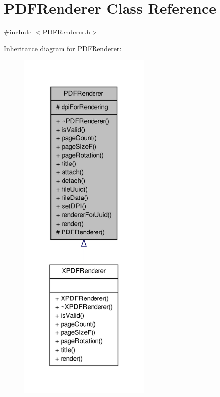 \hypertarget{class_p_d_f_renderer}{\section{P\-D\-F\-Renderer Class Reference}
\label{d7/dc9/class_p_d_f_renderer}
}


{\ttfamily \#include $<$P\-D\-F\-Renderer.\-h$>$}



Inheritance diagram for P\-D\-F\-Renderer\-:
\nopagebreak
\begin{figure}[H]
\begin{center}
\leavevmode
\includegraphics[width=184pt]{d7/dae/class_p_d_f_renderer__inherit__graph}
\end{center}
\end{figure}


